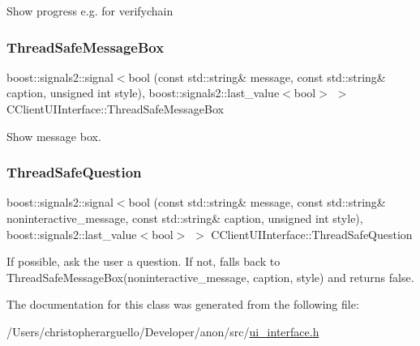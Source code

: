 Show progress e.\+g. for verifychain \mbox{\label{class_c_client_u_i_interface_a9d328cc06777490e90e8c6a9cb31335f}} 
\subsubsection{\texorpdfstring{Thread\+Safe\+Message\+Box}{ThreadSafeMessageBox}}
{\footnotesize\ttfamily boost\+::signals2\+::signal$<$bool (const std\+::string\& message, const std\+::string\& caption, unsigned int style), boost\+::signals2\+::last\+\_\+value$<$bool$>$ $>$ C\+Client\+U\+I\+Interface\+::\+Thread\+Safe\+Message\+Box}

Show message box. \mbox{\label{class_c_client_u_i_interface_aa4db099ecd0f43e4524b9be0ec922b61}} 
\subsubsection{\texorpdfstring{Thread\+Safe\+Question}{ThreadSafeQuestion}}
{\footnotesize\ttfamily boost\+::signals2\+::signal$<$bool (const std\+::string\& message, const std\+::string\& noninteractive\+\_\+message, const std\+::string\& caption, unsigned int style), boost\+::signals2\+::last\+\_\+value$<$bool$>$ $>$ C\+Client\+U\+I\+Interface\+::\+Thread\+Safe\+Question}

If possible, ask the user a question. If not, falls back to Thread\+Safe\+Message\+Box(noninteractive\+\_\+message, caption, style) and returns false. 

The documentation for this class was generated from the following file\+:\begin{DoxyCompactItemize}
\item 
/\+Users/christopherarguello/\+Developer/anon/src/\mbox{\hyperlink{ui__interface_8h}{ui\+\_\+interface.\+h}}\end{DoxyCompactItemize}
